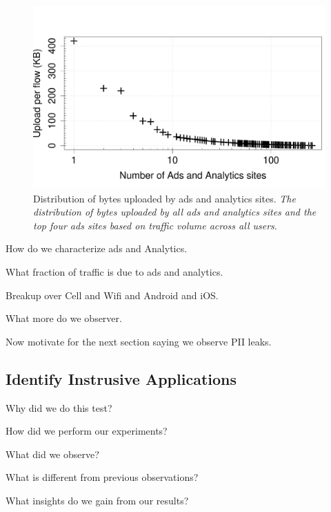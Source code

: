 \begin{figure}
\includegraphics[width=\columnwidth]{plots/num_uploading_trackers.pdf}
\caption{Distribution of bytes uploaded by ads and analytics sites. \emph{The distribution of bytes uploaded by all ads and analytics sites and the top four ads sites based on traffic volume across all users}.}
\label{fig:description}
\end{figure}



How do we characterize ads and Analytics.

What fraction of traffic is due to ads and analytics.

Breakup over Cell and Wifi and Android and iOS.

What more do we observer.

Now motivate for the next section saying we observe PII leaks. 

\subsection{Identify Instrusive Applications}

Why did we do this test?

How did we perform our experiments?

What did we observe?

What is different from previous observations?

What insights do we gain from our results?
